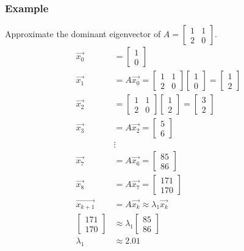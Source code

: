 \documentclass{math}
\begin{document}
\subsubsection*{Example}
Approximate the dominant eigenvector of \( A = \begin{bmatrix}1 & 1 \\
2 & 0\end{bmatrix} \).
\begin{align*}
  \vec{x_0} &= \begin{bmatrix}1 \\ 0\end{bmatrix} \\
  \vec{x_1} &= A\vec{x_0} = \begin{bmatrix}
    1 & 1 \\
    2 & 0
  \end{bmatrix}\begin{bmatrix}1 \\ 0\end{bmatrix} = \begin{bmatrix}
    1 \\ 2
  \end{bmatrix} \\
  \vec{x_2} &= \begin{bmatrix}
    1 & 1 \\
    2 & 0
  \end{bmatrix}\begin{bmatrix}1 \\ 2\end{bmatrix} = \begin{bmatrix}
    3 \\ 2
  \end{bmatrix} \\
  \vec{x_3} &= A\vec{x_2} = \begin{bmatrix}5 \\ 6\end{bmatrix} \\
  &\vdots \\
  \vec{x_7} &= A\vec{x_6} = \begin{bmatrix}85 \\ 86\end{bmatrix} \\
  \vec{x_8} &= A\vec{x_7} = \begin{bmatrix}171 \\ 170\end{bmatrix} \\
  \overrightarrow{x_{k+1}} &= A\vec{x_k} \approx \lambda_1\vec{x_k} \\
  \begin{bmatrix}
    171 \\ 170
  \end{bmatrix} &\approx \lambda_1\begin{bmatrix}85 \\ 86\end{bmatrix} \\
  \lambda_1 &\approx 2.01
\end{align*}
\end{document}
